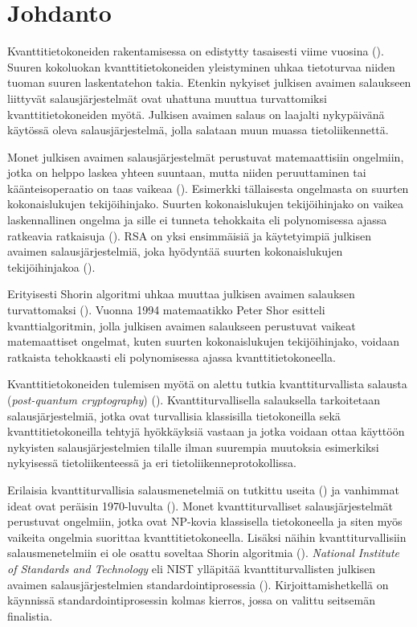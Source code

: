 \chapter{Johdanto\label{intro}}
Kvanttitietokoneiden rakentamisessa on edistytty tasaisesti viime vuosina (\cite{alagic2020status}). Suuren kokoluokan kvanttitietokoneiden yleistyminen uhkaa tietoturvaa niiden tuoman suuren laskentatehon takia. Etenkin nykyiset julkisen avaimen salaukseen liittyvät salausjärjestelmät ovat uhattuna muuttua turvattomiksi kvanttitietokoneiden myötä. Julkisen avaimen salaus on laajalti nykypäivänä käytössä oleva salausjärjestelmä, jolla salataan muun muassa tietoliikennettä. %

Monet julkisen avaimen salausjärjestelmät perustuvat matemaattisiin ongelmiin, jotka on helppo laskea yhteen suuntaan, mutta niiden peruuttaminen tai käänteisoperaatio on taas vaikeaa (\cite{mavroeidis2018impact}). Esimerkki tällaisesta ongelmasta on suurten kokonaislukujen tekijöihinjako. Suurten kokonaislukujen tekijöihinjako on vaikea laskennallinen ongelma ja sille ei tunneta tehokkaita eli polynomisessa ajassa ratkeavia ratkaisuja (\cite{doi:10.1137/S0036144598347011}). RSA on yksi ensimmäisiä ja käytetyimpiä julkisen avaimen salausjärjestelmiä, joka hyödyntää suurten kokonaislukujen tekijöihinjakoa (\cite{montgomery1994survey}).

Erityisesti Shorin algoritmi uhkaa muuttaa julkisen avaimen salauksen turvattomaksi (\cite{mavroeidis2018impact}). Vuonna 1994 matemaatikko Peter Shor esitteli kvanttialgoritmin, jolla julkisen avaimen salaukseen perustuvat vaikeat matemaattiset ongelmat, kuten suurten kokonaislukujen tekijöihinjako, voidaan ratkaista tehokkaasti eli polynomisessa ajassa kvanttitietokoneella.

Kvanttitietokoneiden tulemisen myötä on alettu tutkia kvanttiturvallista salausta (\emph{post-quantum cryptography}) (\cite{alagic2020status}). Kvanttiturvallisella salauksella tarkoitetaan salausjärjestelmiä, jotka ovat turvallisia klassisilla tietokoneilla sekä kvanttitietokoneilla tehtyjä hyökkäyksiä vastaan ja jotka voidaan ottaa käyttöön nykyisten salausjärjestelmien tilalle ilman suurempia muutoksia esimerkiksi nykyisessä tietoliikenteessä ja eri tietoliikenneprotokollissa.

Erilaisia kvanttiturvallisia salausmenetelmiä on tutkittu useita (\cite{mavroeidis2018impact}) ja vanhimmat ideat ovat peräisin 1970-luvulta (\cite{repka2014overview}). Monet kvanttiturvalliset salausjärjestelmät perustuvat ongelmiin, jotka ovat NP-kovia klassisella tietokoneella ja siten myös vaikeita ongelmia suorittaa kvanttitietokoneella. Lisäksi näihin kvanttiturvallisiin salausmenetelmiin ei ole osattu soveltaa Shorin algoritmia (\cite{bernstein2017post}). \emph{National Institute of Standards and Technology} eli NIST ylläpitää kvanttiturvallisten julkisen avaimen salausjärjestelmien standardointiprosessia (\cite{alagic2020status}). Kirjoittamishetkellä on käynnissä standardointiprosessin kolmas kierros, jossa on valittu seitsemän finalistia.

